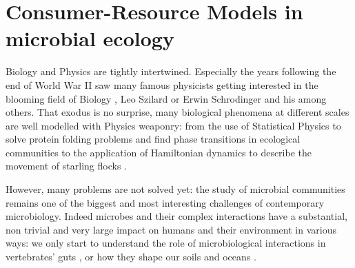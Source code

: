 \documentclass[12pt, titlepage]{report}
\begin{document}
\section[CRMs in microbial ecology]{Consumer-Resource
 Models in microbial ecology}

Biology and Physics are tightly intertwined. Especially the years following the end of World War II saw many famous physicists getting interested in the blooming field of Biology \cite{jogalekar_physicists_nodate}, Leo Szilard or Erwin Schr\¨odinger and his  \cite{schrodinger_what_1944} among others. That exodus is no surprise, many biological phenomena at different scales are well modelled with Physics weaponry: from the use of Statistical Physics to solve protein folding problems \cite{chan_protein_1993} and find phase transitions in ecological communities \cite{fisher_transition_2014} to the application of Hamiltonian dynamics to describe the movement of starling flocks \cite{attanasi_information_2014}.


However, many problems are not solved yet: the study of microbial communities remains one of the biggest and most interesting challenges of contemporary microbiology. Indeed microbes and their complex interactions have a substantial, non trivial and very large impact on humans and their environment in various ways: we only start to understand the role of microbiological interactions in vertebrates' guts \cite{ley_worlds_2008}, or how they shape our soils \cite{becerra-castro_wastewater_2015} and oceans \cite{falkowski_biogeochemical_1998}.
\end{document}
